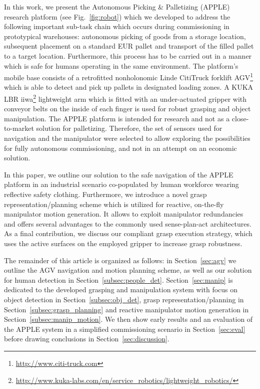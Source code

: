 In this work, we present the Autonomous Picking \& Palletizing (APPLE) research platform (see
Fig.~\ref{fig:robot}) which we developed to address the following important sub-task chain which
occurs during commissioning in prototypical warehouses: autonomous picking of goods from a storage
location, subsequent placement on a standard EUR pallet and transport of the filled pallet to a
target location. Furthermore, this process has to be carried out in a manner which is safe for
humans operating in the same environment. The platform's mobile base consists of a retrofitted
nonholonomic Linde CitiTruck forklift AGV\footnote{\url{ http://www.citi-truck.com}} which is able
to detect and pick up pallets in designated loading zones. A KUKA LBR
iiwa\footnote{\url{http://www.kuka-labs.com/en/service_robotics/lightweight_robotics/}} lightweight
arm which is fitted with an under-actuated gripper with conveyor belts on the inside of each finger
is used for robust grasping and object manipulation. The APPLE platform is intended for research and
not as a close-to-market solution for palletizing. Therefore, the set of sensors used for navigation
and the manipulator were selected to allow exploring the possibilities for fully autonomous
commissioning, and not in an attempt on an economic solution.

In this paper, we outline our solution to the safe navigation of the APPLE platform in an industrial
scenario co-populated by human workforce wearing reflective safety clothing. Furthermore, we
introduce a novel grasp representation/planning scheme which is utilized for reactive, on-the-fly
manipulator motion generation. It allows to exploit manipulator redundancies and offers several
advantages to the commonly used sense-plan-act architectures. As a final contribution, we discuss
our compliant grasp execution strategy, which uses the active surfaces on the employed gripper to
increase grasp robustness.

The remainder of this article is organized as follows: in Section~\ref{sec:agv} we outline the AGV
navigation and motion planning scheme, as well as our solution for human detection in
Section~\ref{subsec:people_det}. Section~\ref{sec:manip} is dedicated to the developed grasping and
manipulation system with focus on object detection in Section~\ref{subsec:obj_det}, grasp
representation/planning in Section~\ref{subsec:grasp_planning} and reactive manipulator motion
generation in Section~\ref{subsec:manip_motion}. We then show early results and an evaluation of the
APPLE system in a simplified commissioning scenario in Section~\ref{sec:eval} before drawing
conclusions in Section~\ref{sec:discussion}.
